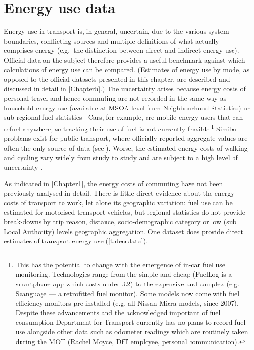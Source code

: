 \documentclass[a4paper, 11pt, twoside]{Thesis}
\begin{document}
\section{Energy use data} \label{senergyusedata}
Energy use in transport is, in
general, uncertain, due to the various system boundaries, conflicting sources
and multiple definitions of what actually comprises energy (e.g.~the distinction
between direct and indirect energy use). Official data on the subject therefore
provides a useful benchmark against which calculations of energy use can be
compared.
(Estimates of energy use by mode, as opposed to
the official datasets presented in this chapter, are described and discussed in
detail in \cref{Chapter5}.) 
The uncertainty arises because
energy costs of personal travel and hence commuting are not recorded in
the same way as
household energy use (available at MSOA level from Neighbourhood Statistics) or
sub-regional fuel statistics \citep{Decc2008}. Cars, for example,
are mobile energy users that
can refuel anywhere, so tracking their use of fuel is not currently
feasible.\footnote{This
has the potential to change with the emergence of
in-car fuel use monitoring. Technologies range from the simple and cheap
(FuelLog is a smartphone app which costs under $\pounds2$) to the expensive
and complex (e.g. Scanguage --- a retrofitted fuel monitor).
Some models now come with fuel efficiency monitors pre-installed
(e.g. all Nissan Micra models, since 2007). Despite these advancements
and the acknowledged important of fuel consumption Department for Transport
currently has no plans to record fuel use alongside other data such as
odometer readings which are routinely taken during the MOT (Rachel Moyce,
DfT employee, personal communication).
}
Similar
problems exist for public transport, where officially reported aggregate values
are often the only source of data (see \citealp{LondonUnderground2007}).
Worse, the estimated energy costs of walking and cycling  vary widely from study
to study and are subject to a high level of uncertainty
\citep{Coley2002, Brand2006, Lovelace2011-assessing}.

As indicated in \cref{Chapter1}, 
the energy costs of commuting have not been previously analysed in detail.
There is little direct evidence about the energy costs of transport to
work, let alone its geographic variation: fuel use can be estimated for
motorised transport vehicles, but regional statistics do not provide break-downs
by trip reason, distance, socio-demographic category or low (sub Local
Authority) levels geographic aggregation. One dataset \citep{Decc2008-tcons,
Decc2013-regcons} does
provide direct estimates of transport energy use (\cref{t:deccdata}).
\end{document}
